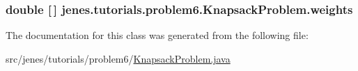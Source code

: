 \hypertarget{classjenes_1_1tutorials_1_1problem6_1_1_knapsack_problem_a1c7f18379c5ca910013fc02748a53bf9}{
\subsubsection[{weights}]{\setlength{\rightskip}{0pt plus 5cm}double \mbox{[}$\,$\mbox{]} jenes.\-tutorials.\-problem6.\-Knapsack\-Problem.\-weights\hspace{0.3cm}{\ttfamily [private]}}}\label{classjenes_1_1tutorials_1_1problem6_1_1_knapsack_problem_a1c7f18379c5ca910013fc02748a53bf9}


The documentation for this class was generated from the following file\-:\begin{DoxyCompactItemize}
\item 
src/jenes/tutorials/problem6/\hyperlink{problem6_2_knapsack_problem_8java}{Knapsack\-Problem.\-java}\end{DoxyCompactItemize}
